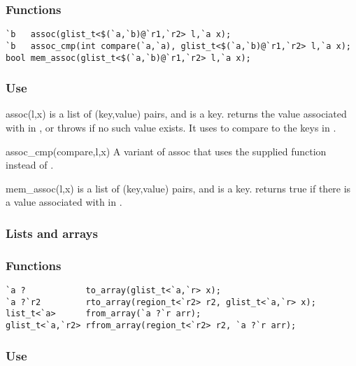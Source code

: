 \subsubsection*{Functions}
\begin{verbatim}
`b   assoc(glist_t<$(`a,`b)@`r1,`r2> l,`a x);
`b   assoc_cmp(int compare(`a,`a), glist_t<$(`a,`b)@`r1,`r2> l,`a x);
bool mem_assoc(glist_t<$(`a,`b)@`r1,`r2> l,`a x);
\end{verbatim}

\subsubsection*{Use}

\begin{defun}{assoc}{(l,x)}
 is a list of (key,value) pairs, and  is a key.
 returns the value associated with  in , or
throws  if no such value exists.  It uses
\code{==} to compare  to the keys in .
\end{defun}

\begin{defun}{assoc_cmp}{(compare,l,x)}
A variant of assoc that uses the supplied  function instead
of \code{==}.
\end{defun}

\begin{defun}{mem_assoc}{(l,x)}
 is a list of (key,value) pairs, and  is a key.
 returns true if there is a value associated with
 in .
\end{defun}


\subsubsection*{Lists and arrays}
\subsubsection*{Functions}
\begin{verbatim}
`a ?            to_array(glist_t<`a,`r> x);
`a ?`r2         rto_array(region_t<`r2> r2, glist_t<`a,`r> x);
list_t<`a>      from_array(`a ?`r arr);
glist_t<`a,`r2> rfrom_array(region_t<`r2> r2, `a ?`r arr);
\end{verbatim}

\subsubsection*{Use}

